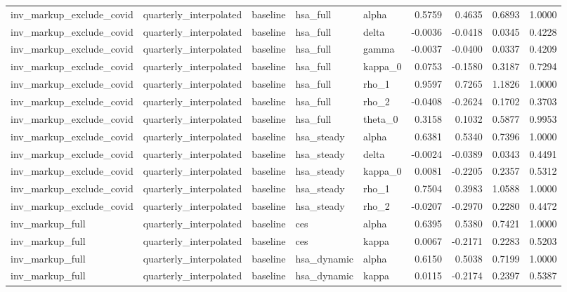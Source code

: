 \begin{tabular}{lllllrrrr}
inv\_markup\_exclude\_covid & quarterly\_interpolated & baseline & hsa\_full & alpha & 0.5759 & 0.4635 & 0.6893 & 1.0000 \\
inv\_markup\_exclude\_covid & quarterly\_interpolated & baseline & hsa\_full & delta & -0.0036 & -0.0418 & 0.0345 & 0.4228 \\
inv\_markup\_exclude\_covid & quarterly\_interpolated & baseline & hsa\_full & gamma & -0.0037 & -0.0400 & 0.0337 & 0.4209 \\
inv\_markup\_exclude\_covid & quarterly\_interpolated & baseline & hsa\_full & kappa\_0 & 0.0753 & -0.1580 & 0.3187 & 0.7294 \\
inv\_markup\_exclude\_covid & quarterly\_interpolated & baseline & hsa\_full & rho\_1 & 0.9597 & 0.7265 & 1.1826 & 1.0000 \\
inv\_markup\_exclude\_covid & quarterly\_interpolated & baseline & hsa\_full & rho\_2 & -0.0408 & -0.2624 & 0.1702 & 0.3703 \\
inv\_markup\_exclude\_covid & quarterly\_interpolated & baseline & hsa\_full & theta\_0 & 0.3158 & 0.1032 & 0.5877 & 0.9953 \\
inv\_markup\_exclude\_covid & quarterly\_interpolated & baseline & hsa\_steady & alpha & 0.6381 & 0.5340 & 0.7396 & 1.0000 \\
inv\_markup\_exclude\_covid & quarterly\_interpolated & baseline & hsa\_steady & delta & -0.0024 & -0.0389 & 0.0343 & 0.4491 \\
inv\_markup\_exclude\_covid & quarterly\_interpolated & baseline & hsa\_steady & kappa\_0 & 0.0081 & -0.2205 & 0.2357 & 0.5312 \\
inv\_markup\_exclude\_covid & quarterly\_interpolated & baseline & hsa\_steady & rho\_1 & 0.7504 & 0.3983 & 1.0588 & 1.0000 \\
inv\_markup\_exclude\_covid & quarterly\_interpolated & baseline & hsa\_steady & rho\_2 & -0.0207 & -0.2970 & 0.2280 & 0.4472 \\
inv\_markup\_full & quarterly\_interpolated & baseline & ces & alpha & 0.6395 & 0.5380 & 0.7421 & 1.0000 \\
inv\_markup\_full & quarterly\_interpolated & baseline & ces & kappa & 0.0067 & -0.2171 & 0.2283 & 0.5203 \\
inv\_markup\_full & quarterly\_interpolated & baseline & hsa\_dynamic & alpha & 0.6150 & 0.5038 & 0.7199 & 1.0000 \\
inv\_markup\_full & quarterly\_interpolated & baseline & hsa\_dynamic & kappa & 0.0115 & -0.2174 & 0.2397 & 0.5387 \\

\end{tabular}

